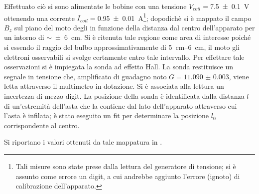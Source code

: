 		Effettuato ciò si sono alimentate le bobine con una tensione
		$V_{coil}=$\SI{7.5 \pm 0.1}{\volt} ottenendo una corrente
		$I_{coil}=$\SI{0.95 \pm 0.01}{\ampere}\footnote{Tali misure sono state prese
		dalla lettura del generatore di tensione;
		si è assunto come errore un digit, a cui andrebbe
		aggiunto l'errore (ignoto) di calibrazione dell'apparato.};
		dopodichè si è mappato il campo $B_z$ sul
		piano del moto degli \e in funzione della distanza dal centro dell'apparato
		per un intorno di $\sim $\SI{\pm 6}{\cm}.
		Si è ritenuta tale regione come area di interesse poiché si essendo il
		raggio del bulbo approssimativamente di \SIrange{5}{6}{\cm},
		il moto gli elettroni osservabili si svolge certamente entro tale intervallo.
		Per effettare tale osservazioni si è impiegata la sonda ad effetto Hall.
		La sonda restituisce un segnale in tensione che, amplificato
		di guadagno noto $G = \num{11.090(3)}$, viene letta attraverso il multimetro
		in dotazione. Si è associata alla lettura un incertezza di mezzo digit.
		La posizione della sonda è identificata dalla distanza $l$ di un'estremità dell'asta
		che la contiene dal lato dell'apparato attraverso cui l'asta è infilata;
		è stato eseguito un fit per determinare la posizione $l_0$ corrispondente al centro.

		Si riportano i valori ottenuti da tale mappatura in .


